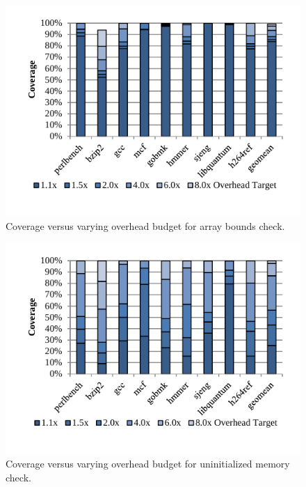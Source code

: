\begin{figure}
  \begin{center}
    \includegraphics[width=\linewidth]{figs/data_bc_sweep.pdf}
    \vspace{-0.2in}
    \caption{Coverage versus varying overhead budget for array bounds check.}
    \label{fig:evaluation.bc_sweep}
    \vspace{-0.2in}
  \end{center}
\end{figure}

\begin{figure}
  \begin{center}
    \includegraphics[width=\linewidth]{figs/data_umc_sweep.pdf}
    \vspace{-0.2in}
    \caption{Coverage versus varying overhead budget for uninitialized memory check.}
    \label{fig:evaluation.umc_sweep}
    \vspace{-0.1in}
  \end{center}
\end{figure}

